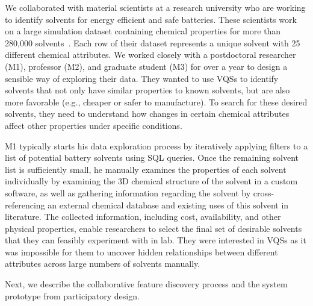  \par\noindent{} We collaborated with material scientists at a research university who are working to identify solvents for energy efficient and safe batteries. These scientists work on a large simulation dataset containing chemical properties for more than 280,000 solvents~\cite{Khetan2018}. Each row of their dataset represents a unique solvent with 25 different chemical attributes. We worked closely with a postdoctoral researcher (M1), professor (M2), and graduate student (M3) for over a year to design a sensible way of exploring their data. They wanted to use VQSs to identify solvents that not only have similar properties to known solvents, but are also more favorable (e.g., cheaper or safer to manufacture). To search for these desired solvents, they need to understand how changes in certain chemical attributes affect other properties under specific conditions.
 
 \npar M1 typically starts his data exploration process by iteratively applying filters to a list of potential battery solvents using SQL queries. Once the remaining solvent list is sufficiently small, he manually examines the properties of each solvent individually by examining the 3D chemical structure of the solvent in a custom software, as well as gathering information regarding the solvent by cross-referencing an external chemical database and existing uses of this solvent in literature. The collected information, including cost, availability, and other physical properties, enable researchers to select the final set of desirable solvents that they can feasibly experiment with in lab. They were interested in VQSs as it was impossible for them to uncover hidden relationships between different attributes across large numbers of solvents manually.%
 \par Next, we describe the collaborative feature discovery process and the system prototype from participatory design.
 